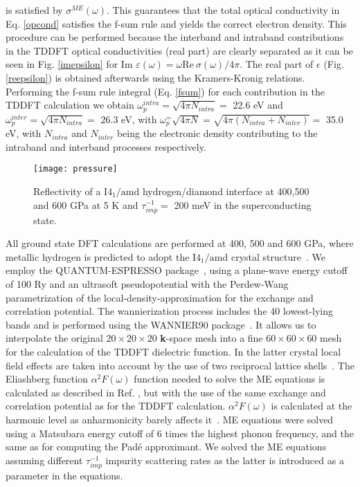 \documentclass[11pt,titlepage,a4paper,twoside]{article}
\begin{document}
is satisfied by $\sigma^{ME}(\omega)$. This guarantees that 
the total optical conductivity in Eq. \eqref{opcond} 
satisfies the f-sum rule and yields the correct electron density.
This procedure can be performed because the interband and intraband
contributions in the TDDFT optical conductivities (real part) are
clearly separated as it can be seen in Fig. \ref{imepsilon} for Im $\varepsilon(\omega)=\omega\mathrm{Re~}\sigma(\omega)/4\pi$. The real part of $\epsilon$ (Fig. \ref{reepsilon})
is obtained afterwards using the Kramers-Kronig relations.   
Performing the f-sum rule integral (Eq. \eqref{fsum}) for each contribution in the TDDFT calculation
we obtain $\omega_p^{intra}=\sqrt{4 \pi N_{intra}}=$ 22.6 eV and $\omega_p^{inter}=\sqrt{4 \pi N_{intra}}=$ 26.3 eV, with
$\omega_p^=\sqrt{4 \pi N}=\sqrt{4 \pi (N_{intra}+N_{inter})}=$ 35.0 eV, with $N_{intra}$ and $N_{inter}$ being the electronic density contributing to the intraband
and interband processes respectively. 


\begin{figure}[t]
 \texttt{[image: pressure]}\hspace{0.1cm}
 \caption{\label{pressure} Reflectivity of a $\mathrm{I4_1/amd}$ hydrogen/diamond interface at 400,500 and 600 GPa at 5 K and $\tau_{imp}^{-1}=$ 200 meV in the superconducting state.
}
\end{figure}


All ground state DFT calculations are performed
at 400, 500 and 600 GPa, where metallic hydrogen 
is predicted to adopt the $\mathrm{I4_1/amd}$ 
crystal structure~\cite{PhysRevLett.112.165501,PhysRevLett.106.165302}.
We employ the QUANTUM-ESPRESSO package~\cite{0953-8984-21-39-395502}, 
using a plane-wave energy cutoff of 100 Ry and 
an ultrasoft pseudopotential\cite{PhysRevB.41.7892} 
with the Perdew-Wang parametrization of the 
local-density-approximation\cite{PhysRevB.45.13244} for the exchange and correlation potential. 
The wannierization process includes the 40 lowest-lying bands and is performed 
using the WANNIER90 package~\cite{Mostofi20142309}.
It allows us to interpolate the original $20\times20\times20$ \textbf{k}-space mesh
into a fine $60\times60\times60$ mesh for the calculation of the TDDFT 
dielectric function. In the latter crystal local field effects are taken into account by the use of 
two reciprocal lattice shells~\cite{PhysRevB.85.054305,PhysRevB.89.085102}.
The Eliashberg function $\alpha^2F(\omega)$ function needed to solve the
ME equations is calculated as described in Ref. \cite{PhysRevB.93.174308},
but with the use of the same exchange and correlation potential as
for the TDDFT calculation. $\alpha^2F(\omega)$ is calculated
at the harmonic level as anharmonicity barely affects it~\cite{PhysRevB.93.174308}. ME equations were solved
using a Matsubara energy cutoff of 6 times the highest phonon frequency, and the same as for computing the Padé approximant. We
solved the ME equations assuming different $\tau_{imp}^{-1}$ impurity scattering rates as the latter is introduced as a parameter in the equations. 
\end{document}

